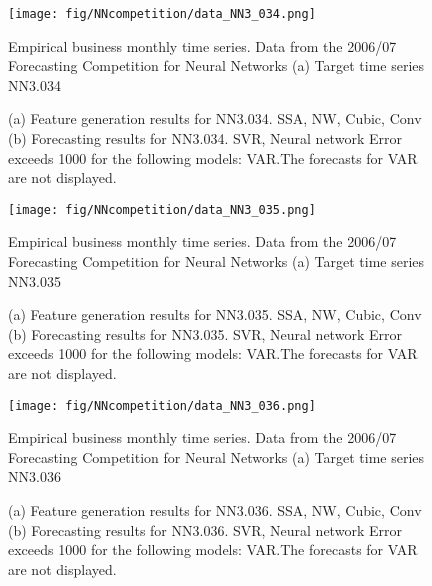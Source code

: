 \documentclass[12pt]{article}
\begin{document}
\begin{figure}
\centering
\texttt{[image: fig/NNcompetition/data\_NN3\_034.png]}
\caption{Empirical business monthly time series. Data from the 2006/07 Forecasting Competition for Neural Networks	(a) Target time series	NN3.034	}
\end{figure}


\begin{figure}
\centering
{}
\caption{(a)	Feature generation results for	NN3.034.	SSA, NW, Cubic, Conv	(b)	Forecasting results for	NN3.034.	SVR, Neural network	Error exceeds 1000 for the following models: VAR.The forecasts for VAR are not displayed.	}
\end{figure}


\begin{figure}
\centering
\texttt{[image: fig/NNcompetition/data\_NN3\_035.png]}
\caption{Empirical business monthly time series. Data from the 2006/07 Forecasting Competition for Neural Networks	(a) Target time series	NN3.035	}
\end{figure}


\begin{figure}
\centering
{}
\caption{(a)	Feature generation results for	NN3.035.	SSA, NW, Cubic, Conv	(b)	Forecasting results for	NN3.035.	SVR, Neural network	Error exceeds 1000 for the following models: VAR.The forecasts for VAR are not displayed.	}
\end{figure}


\begin{figure}
\centering
\texttt{[image: fig/NNcompetition/data\_NN3\_036.png]}
\caption{Empirical business monthly time series. Data from the 2006/07 Forecasting Competition for Neural Networks	(a) Target time series	NN3.036	}
\end{figure}


\begin{figure}
\centering
{}
\caption{(a)	Feature generation results for	NN3.036.	SSA, NW, Cubic, Conv	(b)	Forecasting results for	NN3.036.	SVR, Neural network	Error exceeds 1000 for the following models: VAR.The forecasts for VAR are not displayed.	}
\end{figure}
\end{document}
